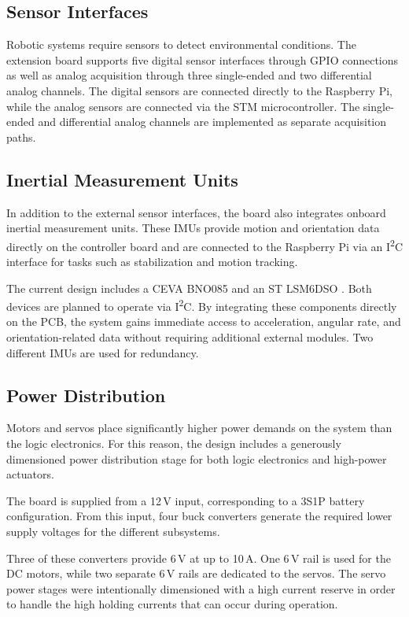 \documentclass[conference]{IEEEtran}
\begin{document}
	\subsection{Sensor Interfaces}
	
	Robotic systems require sensors to detect environmental conditions. The extension board supports five digital sensor interfaces through GPIO connections as well as analog acquisition through three single-ended and two differential analog channels. The digital sensors are connected directly to the Raspberry Pi, while the analog sensors are connected via the STM microcontroller. The single-ended and differential analog channels are implemented as separate acquisition paths.
	
	\subsection{Inertial Measurement Units}
	
	In addition to the external sensor interfaces, the board also integrates onboard inertial measurement units. These IMUs provide motion and orientation data directly on the controller board and are connected to the Raspberry Pi via an I\textsuperscript{2}C interface for tasks such as stabilization and motion tracking.
	
	The current design includes a CEVA BNO085 \cite{b4} and an ST LSM6DSO \cite{b5}. Both devices are planned to operate via I\textsuperscript{2}C. By integrating these components directly on the PCB, the system gains immediate access to acceleration, angular rate, and orientation-related data without requiring additional external modules. Two different IMUs are used for redundancy.
	
	\subsection{Power Distribution}
	
	Motors and servos place significantly higher power demands on the system than the logic electronics. For this reason, the design includes a generously dimensioned power distribution stage for both logic electronics and high-power actuators.
	
	The board is supplied from a 12\,V input, corresponding to a 3S1P battery configuration. From this input, four buck converters generate the required lower supply voltages for the different subsystems.
	
	Three of these converters provide 6\,V at up to 10\,A. One 6\,V rail is used for the DC motors, while two separate 6\,V rails are dedicated to the servos. The servo power stages were intentionally dimensioned with a high current reserve in order to handle the high holding currents that can occur during operation.
	
\end{document}
